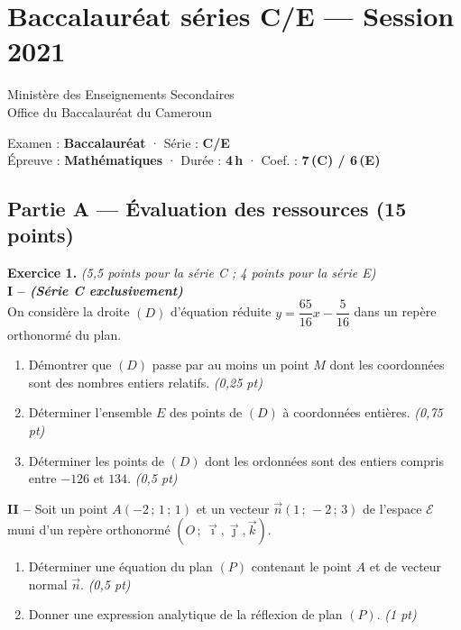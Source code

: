 \section{Baccalauréat séries C/E — Session 2021}
\noindent\begin{minipage}{0.5\linewidth}\footnotesize Ministère des Enseignements Secondaires\\Office du Baccalauréat du Cameroun\end{minipage}%
\hfill\begin{minipage}{0.45\linewidth}\footnotesize\raggedleft Examen : \textbf{Baccalauréat} · Série : \textbf{C/E}\\
Épreuve : \textbf{Mathématiques} · Durée : \textbf{4\,h} · Coef. : \textbf{7\,(C) / 6\,(E)}\end{minipage}
\par\smallskip{\color{onbo}\rule{\linewidth}{1pt}}

\subsection*{Partie A — Évaluation des ressources \hfill (15 points)}

\noindent\textbf{Exercice 1.} \hfill\textit{(5,5 points pour la série C ; 4 points pour la série E)}\\[2pt]
\noindent\textbf{I -- \textit{(Série C exclusivement)}}\\
On considère la droite $(D)$ d'équation réduite $y=\dfrac{65}{16}x-\dfrac{5}{16}$ dans un repère orthonormé du plan.
\begin{enumerate}[label=\arabic*)]
\item Démontrer que $(D)$ passe par au moins un point $M$ dont les coordonnées sont des nombres entiers relatifs. \hfill\textit{(0,25 pt)}
\item Déterminer l'ensemble $E$ des points de $(D)$ à coordonnées entières. \hfill\textit{(0,75 pt)}
\item Déterminer les points de $(D)$ dont les ordonnées sont des entiers compris entre $-126$ et $134$. \hfill\textit{(0,5 pt)}
\end{enumerate}

\noindent\textbf{II -- } Soit un point $A(-2\,;\,1\,;\,1)$ et un vecteur $\vec n(1\,;\,-2\,;\,3)$ de l'espace $\mathcal E$ muni d'un repère orthonormé $(O\,;\,\vec\imath,\vec\jmath,\vec k)$.
\begin{enumerate}[label=\arabic*)]
\item Déterminer une équation du plan $(P)$ contenant le point $A$ et de vecteur normal $\vec n$. \hfill\textit{(0,5 pt)}
\item Donner une expression analytique de la réflexion de plan $(P)$. \hfill\textit{(1 pt)}
\end{enumerate}

